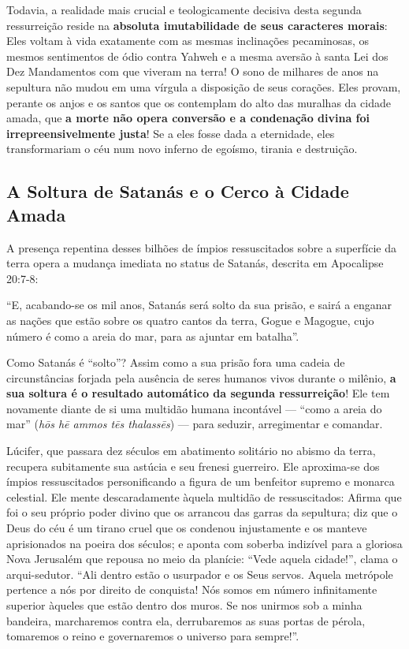 Todavia, a realidade mais crucial e teologicamente decisiva desta segunda ressurreição reside na \textbf{absoluta imutabilidade de seus caracteres morais}:
Eles voltam à vida exatamente com as mesmas inclinações pecaminosas, os mesmos sentimentos de ódio contra Yahweh e a mesma aversão à santa Lei dos Dez Mandamentos com que viveram na terra!
O sono de milhares de anos na sepultura não mudou em uma vírgula a disposição de seus corações. Eles provam, perante os anjos e os santos que os contemplam do alto das muralhas da cidade amada, que \textbf{a morte não opera conversão e a condenação divina foi irrepreensivelmente justa}! Se a eles fosse dada a eternidade, eles transformariam o céu num novo inferno de egoísmo, tirania e destruição.



\subsection{A Soltura de Satanás e o Cerco à Cidade Amada}


A presença repentina desses bilhões de ímpios ressuscitados sobre a superfície da terra opera a mudança imediata no status de Satanás, descrita em Apocalipse 20:7-8:

``E, acabando-se os mil anos, Satanás será solto da sua prisão, e sairá a enganar as nações que estão sobre os quatro cantos da terra, Gogue e Magogue, cujo número é como a areia do mar, para as ajuntar em batalha''.

Como Satanás é ``solto''?
Assim como a sua prisão fora uma cadeia de circunstâncias forjada pela ausência de seres humanos vivos durante o milênio, \textbf{a sua soltura é o resultado automático da segunda ressurreição}! Ele tem novamente diante de si uma multidão humana incontável — ``como a areia do mar'' (\textit{hōs hē ammos tēs thalassēs}) — para seduzir, arregimentar e comandar.

Lúcifer, que passara dez séculos em abatimento solitário no abismo da terra, recupera subitamente sua astúcia e seu frenesi guerreiro. Ele aproxima-se dos ímpios ressuscitados personificando a figura de um benfeitor supremo e monarca celestial. Ele mente descaradamente àquela multidão de ressuscitados:
Afirma que foi o seu próprio poder divino que os arrancou das garras da sepultura; diz que o Deus do céu é um tirano cruel que os condenou injustamente e os manteve aprisionados na poeira dos séculos; e aponta com soberba indizível para a gloriosa Nova Jerusalém que repousa no meio da planície:
``Vede aquela cidade!'', clama o arqui-sedutor. ``Ali dentro estão o usurpador e os Seus servos. Aquela metrópole pertence a nós por direito de conquista! Nós somos em número infinitamente superior àqueles que estão dentro dos muros. Se nos unirmos sob a minha bandeira, marcharemos contra ela, derrubaremos as suas portas de pérola, tomaremos o reino e governaremos o universo para sempre!''.

